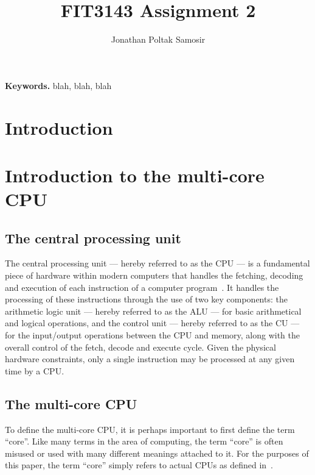 \documentclass[a4paper,11pt]{article}
\author{Jonathan Poltak Samosir}
\title{FIT3143 Assignment 2}
\begin{document}
\maketitle
\thispagestyle{empty}

\begin{abstract}
\end{abstract}
\smallskip
\noindent \textbf{Keywords.} blah, blah, blah
\newpage
{}
\tableofcontents
\newpage


\section{Introduction} %
\label{sec:introduction}



\section{Introduction to the multi-core CPU} %
\label{sec:introduction_to_the_multi_core_cpu}

\subsection{The central processing unit} %
\label{sub:the_central_processing_unit}
The central processing unit --- hereby referred to as the CPU --- is a fundamental piece of hardware within modern computers that handles
the fetching, decoding and execution of each instruction of a computer program~\cite{web:CPUWiki}. It handles the processing
of these instructions through the use of two key components: the arithmetic logic unit --- hereby referred to as the ALU
--- for basic arithmetical and logical operations, and the control unit --- hereby referred to as the CU --- for the input/output
operations between the CPU and memory, along with the overall control of the fetch, decode and execute cycle. Given the
physical hardware constraints, only a single instruction may be processed at any given time by a CPU.

\subsection{The multi-core CPU} %
\label{sub:the_multi_core_cpu}
To define the multi-core CPU, it is perhaps important to first define the term ``core''. Like many terms in the area of computing,
the term ``core'' is often misused or used with many different meanings attached to it. For the purposes of this paper, the
term ``core'' simply refers to actual CPUs as defined in~.
\end{document}
